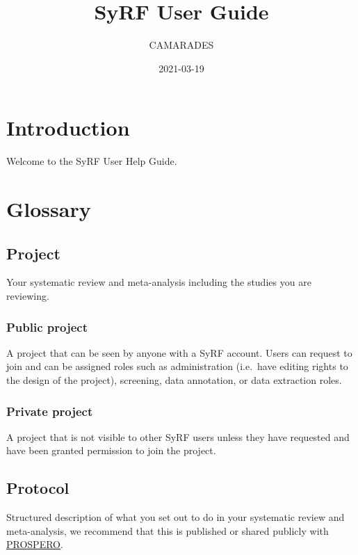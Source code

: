 \documentclass[
]{book}
\title{SyRF User Guide}
\author{CAMARADES}
\date{2021-03-19}
\begin{document}
\maketitle

{
\setcounter{tocdepth}{1}
\tableofcontents
}
\hypertarget{intro}{%
\chapter{Introduction}\label{intro}}

Welcome to the SyRF User Help Guide.

\hypertarget{glossary}{%
\chapter{Glossary}\label{glossary}}

\hypertarget{project}{%
\section{Project}\label{project}}

Your systematic review and meta-analysis including the studies you are reviewing.

\hypertarget{public-project}{%
\subsection{Public project}\label{public-project}}

A project that can be seen by anyone with a SyRF account. Users can request to join and can be assigned roles such as administration (i.e.~have editing rights to the design of the project), screening, data annotation, or data extraction roles.

\hypertarget{private-project}{%
\subsection{Private project}\label{private-project}}

A project that is not visible to other SyRF users unless they have requested and have been granted permission to join the project.

\hypertarget{protocol}{%
\section{Protocol}\label{protocol}}

Structured description of what you set out to do in your systematic review and meta-analysis, we recommend that this is published or shared publicly with \href{https://www.crd.york.ac.uk/prospero/}{PROSPERO}.
\end{document}
